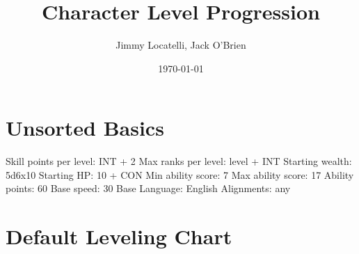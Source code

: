 \documentclass[12pt]{article}
\begin{document}
\title{Character Level Progression}
\author{Jimmy Locatelli, Jack O'Brien}
\date{\today}
\maketitle



\section{Unsorted Basics}

Skill points per level: INT + 2
Max ranks per level: level + INT
Starting wealth: 5d6x10
Starting HP: 10 + CON
Min ability score: 7
Max ability score: 17
Ability points: 60
Base speed: 30
Base Language: English
Alignments: any

\section{Default Leveling Chart}
\end{document}

